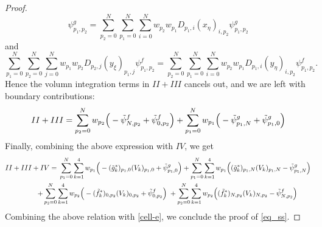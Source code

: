 \documentclass[fleqn,11pt]{amsart}
\newcommand{\domgr}{\partial\Omega_{\mathrm{ref}}}
\begin{document}
{\begin{proof}
\[\psi^g_{p_1,p_2}
= 
\sum_{p_2=0}^N\sum_{p_1=0}^N\sum_{i=0}^Nw_{p_2} w_{p_1}D_{p_1,i}(x_{\eta})_{i,p_2}
\psi^g_{p_1,p_2}
\]
and 
\[
\sum_{p_1=0}^N\sum_{p_2=0}^N\sum_{j=0}^Nw_{p_1} w_{p_2}D_{p_2,j}(y_{\xi})_{p_1,j}
\psi^f_{p_1,p_2}
= 
\sum_{p_2=0}^N\sum_{p_1=0}^N\sum_{i=0}^Nw_{p_2} w_{p_1}D_{p_1,i}(y_{\eta})_{i,p_2}
\psi^f_{p_1,p_2}.
\]
Hence the volumn integration terms in $II+III$ cancels out, and we are left with boundary contributions:
\begin{align}
    \label{ii}
    II+III = 
    \sum_{p_2=0}^Nw_{p_2}\Big(-\Tilde{\psi}^f_{N, p_2} + \Tilde{\psi}^f_{0, p_2}\Big)+
\sum_{p_1=0}^Nw_{p_1}\Big(-\Tilde{\psi}^g_{p_1, N} + \Tilde{\psi}^g_{p_1, 0}\Big)
\end{align}
Finally, combining the above expression with  $IV$, we get 
\begin{align*}
    II+III+IV = &\;
\sum_{p_1=0}^N\sum_{k=1}^4 w_{p_1}\Big(
-(\Tilde{g}_k^*)_{p_1,0}(V_k)_{p_1,0}
+ \Tilde{\psi}^g_{p_1, 0}\Big) 
+ 
\sum_{p_1=0}^N\sum_{k=1}^4 w_{p_1}\Big(
(\Tilde{g}_k^*)_{p_1,N}(V_k)_{p_1,N}
- \Tilde{\psi}^g_{p_1, N}
\Big)\\
+\sum_{p_2=0}^N&\sum_{k=1}^4
w_{p_2}\Big(
-(\Tilde{f}_k^*)_{0,p_2}(V_k)_{0,p_2}
+\Tilde{\psi}^f_{0, p_2}\Big)\;+\sum_{p_2=0}^N\sum_{k=1}^4
w_{p_2}\Big(
(\Tilde{f}_k^*)_{N,p_2}(V_k)_{N,p_2}
-\Tilde{\psi}^f_{N, p_2}\Big)
\end{align*}
Combining the above relation with \eqref{cell-e}, we conclude the proof of \eqref{eq_ss}.



\end{proof}}
\end{document}
